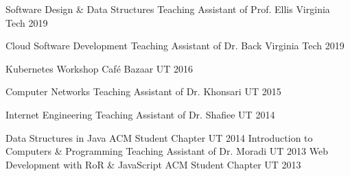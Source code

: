

\begin{cvhonors}

  \cvhonor
    {Software Design \& Data Structures} %
    {Teaching Assistant of Prof. Ellis} %
    {Virginia Tech} %
    {2019} %

  \cvhonor
    {Cloud Software Development} %
    {Teaching Assistant of Dr. Back} %
    {Virginia Tech} %
    {2019} %

  \cvhonor
    {Kubernetes Workshop} %
    {Café Bazaar} %
    {UT} %
    {2016} %

  \cvhonor
    {Computer Networks} %
    {Teaching Assistant of Dr. Khonsari} %
    {UT} %
    {2015} %

  \cvhonor
    {Internet Engineering} %
    {Teaching Assistant of Dr. Shafiee} %
    {UT} %
    {2014} %

  \cvhonor
    {Data Structures in Java} %
    {ACM Student Chapter} %
    {UT} %
    {2014} %
  \cvhonor
    {Introduction to Computers \& Programming} %
    {Teaching Assistant of Dr. Moradi} %
    {UT} %
    {2013} %
  \cvhonor
    {Web Development with RoR \& JavaScript} %
    {ACM Student Chapter} %
    {UT} %
    {2013} %
\end{cvhonors}
